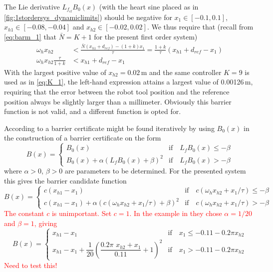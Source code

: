 The Lie derivative $L_{f_{cl}}B_0(x)$ (with the heart sine placed as in \autoref{fig:1stordersys_dynamiclimits}) should be negative for  $x_1\in[-0.1,0.1]$, $x_{h1}\in [-0.08,-0.04]$ and $x_{h2}\in [-0.02,0.02]$. We thus require that (recall from \autoref{eq:barm_1} that $\bar{N}=K+1$ for the present first order system)
\begin{align}
\omega_h x_{h2} &< \frac{\bar{N}(x_{h1} + d_{ref})-(1+k) x_1}{\tau} = \frac{1+k}{\tau}(x_{h1} + d_{ref}-x_1)\nonumber\\
\omega_h x_{h2} \frac{\tau}{1+k} &< x_{h1} + d_{ref}-x_1
\end{align}
With the largest positive value of $x_{h2}=0.02$\,m and the same controller $K=9$ is used as in \autoref{eq:K_1}, the left-hand expression attains a largest value of 0.00126\,m, requiring that the error between the robot tool position and the reference position always be slightly larger than a millimeter. 
Obviously this barrier function is not valid, and a different function is opted for.

According to \cite{bib:org_control} a barrier certificate might be found iteratively by using $B_0(x)$ in the construction of a barrier certificate on the form
\begin{equation}
B(x) = 
\begin{cases}
B_0(x) & \text{if}\quad L_fB_0(x) \leq -\beta\\
B_0(x)+\alpha(L_fB_0(x)+\beta)^2 & \text{if}\quad L_fB_0(x)>-\beta 
\end{cases}
\end{equation}
where $\alpha>0$, $\beta>0$ are parameters to be determined. For the presented system this gives the barrier candidate function 
\begin{equation}
B(x) = 
\begin{cases}
c(x_{h1}-x_1) & \text{if}\quad c\left(\omega_h x_{h2} +  x_1/\tau\right) \leq -\beta\\
c(x_{h1}-x_1)+\alpha(c\left(\omega_h x_{h2} +  x_1/\tau\right)+\beta)^2 & \text{if}\quad c\left(\omega_h x_{h2} +  x_1/\tau\right)>-\beta 
\end{cases}
\end{equation}
\textcolor{red}{The constant $c$ is unimportant. Set $c=1$.  In the example in \citep{bib:org_control} they chose $\alpha=1/20$ and $\beta=1$, giving}
\begin{equation}
B(x) = 
\begin{cases}
x_{h1}-x_1 & \text{if}\quad x_1 \leq -0.11-0.2\pi x_{h2}\\
x_{h1}-x_1+\dfrac{1}{20}\left(\dfrac{0.2\pi\,\, x_{h2} +   x_1}{0.11}+1\right)^2 & \text{if}\quad x_1 > -0.11-0.2\pi x_{h2} 
\end{cases}
\end{equation}
\textcolor{red}{Need to test this!}


